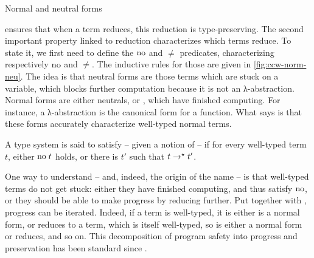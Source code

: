 \begin{marginfigure}
  \caption{Normal and neutral forms}
  \label{fig:ccw-norm-neu}
\end{marginfigure}

 ensures that when a term reduces, this reduction is type-preserving.
The second important property linked to reduction characterizes which terms reduce.
To state it, we first need to define the $\mathrel{\mathrm{no}}$ and $\ne$ predicates,
characterizing respectively  $\mathrel{\mathrm{no}}$ and  $\ne$.
The inductive rules for those are given in \cref{fig:ccw-norm-neu}.
The idea is that neutral forms are those terms which are stuck on a variable, which blocks
further computation because it is not an λ-abstraction. Normal forms are either neutrals,
or , which have finished computing. For instance, a λ-abstraction is
the canonical form for a function. What  says is that these forms accurately
characterize well-typed normal terms.

\begin{property}[Progress]
  A type system is said to satisfy  – given a notion of  –
  if for every well-typed term $t$, either $\mathrel{\mathrm{no}} t$ holds, or there is $t'$ such that
  $t \rightarrow^{\star} t'$.
\end{property}

One way to understand  – and, indeed, the origin of the name – is that well-typed
terms do not get stuck: either they have finished computing, and thus satisfy $\mathrel{\mathrm{no}}$, or
they should be able to make progress by reducing further.
Put together with , progress can be iterated. Indeed,
if a term is well-typed, it is either is a normal form, or reduces to a term, which is itself
well-typed, so is either a normal form or reduces, and so on. This decomposition of
program safety into progress and preservation
has been standard since .

